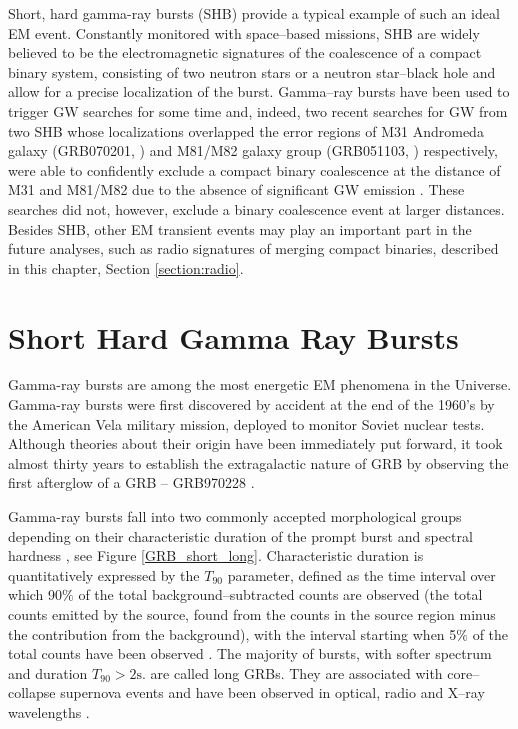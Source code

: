 Short, hard gamma-ray bursts (SHB) provide a typical example of such an ideal \ac{EM} event. Constantly monitored with space--based missions, \ac{SHB} are widely believed to be the electromagnetic signatures of the coalescence of a compact binary system, consisting of two neutron stars or a neutron star--black hole and allow for a precise localization of the burst. Gamma--ray bursts have been used to trigger GW searches for some time \cite{Abbott:2007rh,Collaboration:2009kk,0264-9381-25-22-225001} and, indeed, two recent searches for GW from two \ac{SHB} whose localizations overlapped the error regions of M31 Andromeda galaxy (GRB070201, \cite{Ofek:2007th}) and M81/M82 galaxy group (GRB051103, \cite{Ofek:2006pr}) respectively, were able to confidently exclude a compact binary coalescence at the distance of M31 and M81/M82 due to the absence of significant GW emission \cite{Abbott:2007rh}. These searches did not, however, exclude a binary coalescence event at larger distances. Besides SHB, other EM transient events may play an important part in the future analyses, such as radio signatures of merging compact binaries, described in this chapter, Section \ref{section:radio}.

\section{Short Hard Gamma Ray Bursts}

Gamma-ray bursts are among the most energetic \ac{EM} phenomena in the Universe. Gamma-ray bursts were first discovered by accident at the end of the 1960's by the American Vela military mission, deployed to monitor Soviet nuclear tests. Although theories about their origin have been immediately put forward, it took almost thirty years to establish the extragalactic nature of \ac{GRB} by observing the first afterglow of a \ac{GRB} -- GRB970228 \cite{Costa:1997ji}. 

Gamma-ray bursts fall into two commonly accepted morphological groups depending on their characteristic duration of the prompt burst and spectral hardness \cite{Nakar:2007, Qinx:2010kp, Kouveliotou:1993yx, Gehrels:2006tk, Nemiroff:1993vi}, see Figure \ref{GRB_short_long}. Characteristic duration is quantitatively expressed by the $T_{90}$ parameter, defined as the time interval over which 90$\%$ of the total background--subtracted counts are observed (the total counts emitted by the source, found from the counts in the source region minus the contribution from the background), with the interval starting when 5$\%$ of the total counts have been observed \cite{McBreen:2001fd}. The majority of bursts, with softer spectrum and duration $T_{90} > \mathrm{2s.}$ are called long GRBs. They are associated with core--collapse supernova events and have been observed in optical, radio and X--ray wavelengths \cite{Campana:2006qe,Galama:1998ea,Hjorth:2003jt,Malesani:2004sg}.

